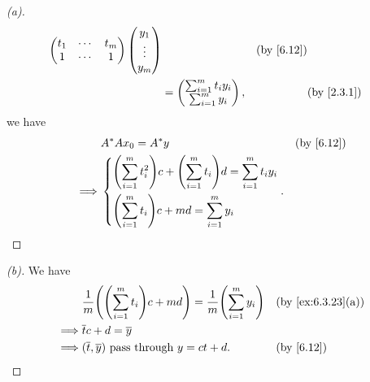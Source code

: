 \begin{proof}[(a)]
\begin{align*}
\begin{pmatrix}
                    t_1 & \cdots & t_m \\
                    1   & \cdots & 1
                  \end{pmatrix} \begin{pmatrix}
                                  y_1    \\
                                  \vdots \\
                                  y_m
                                \end{pmatrix}                                                    &  & \text{(by \cref{6.12})} \\
              & = \begin{pmatrix}
                    \sum_{i = 1}^m t_i y_i \\
                    \sum_{i = 1}^m y_i
                  \end{pmatrix},                                                        &  & \text{(by \cref{2.3.1})}
  \end{align*}
  we have
  \begin{align*}
             & A^* A x_0 = A^* y                                                                                         &  & \text{(by \cref{6.12})} \\
    \implies & \begin{dcases}
                 \pa{\sum_{i = 1}^m t_i^2} c + \pa{\sum_{i = 1}^m t_i} d = \sum_{i = 1}^m t_i y_i \\
                 \pa{\sum_{i = 1}^m t_i} c + md = \sum_{i = 1}^m y_i
               \end{dcases}.
  \end{align*}
\end{proof}

\begin{proof}[(b)]
  We have
  \begin{align*}
             & \frac{1}{m} \pa{\pa{\sum_{i = 1}^m t_i} c + md} = \frac{1}{m} \pa{\sum_{i = 1}^m y_i} &  & \text{(by \cref{ex:6.3.23}(a))} \\
    \implies & \overline{t} c + d = \overline{y}                                                                                          \\
    \implies & (\overline{t}, \overline{y}) \text{ pass through } y = ct + d.                        &  & \text{(by \cref{6.12})}
  \end{align*}
\end{proof}

